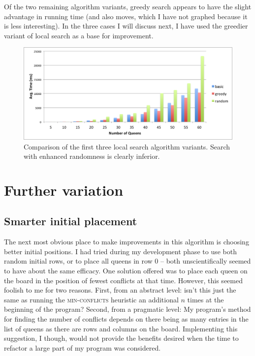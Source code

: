 \documentclass{article}
\begin{document}
\begin{doublespace}
Of the two remaining algorithm variants, greedy search appears to have the slight advantage in running time (and also moves, which I have not graphed because it is less interesting). In the three cases I will discuss next, I have used the greedier variant of local search as a base for improvement.

\begin{figure}[ht!]
\centering
\includegraphics[width=6.5in]{./compare1-3.png}
\caption{Comparison of the first three local search algorithm variants. Search with enhanced randomness is clearly inferior.}
\end{figure}

\section{Further variation}
\subsection{Smarter initial placement}
The next most obvious place to make improvements in this algorithm is choosing better initial positions. I had tried during my development phase to use both random initial rows, or to place all queens in row 0 -- both unscientifically seemed to have about the same efficacy. One solution offered was to place each queen on the board in the position of fewest conflicts at that time. However, this seemed foolish to me for two reasons. First, from an abstract level: isn't this just the same as running the \textsc{min-conflicts} heuristic an additional $n$ times at the beginning of the program? Second, from a pragmatic level: My program's method for finding the number of conflicts depends on there being as many entries in the list of queens as there are rows and columns  on the board. Implementing this suggestion, I though, would not provide the benefits desired when the time to refactor a large part of my program was considered.


\end{doublespace}
\end{document}
